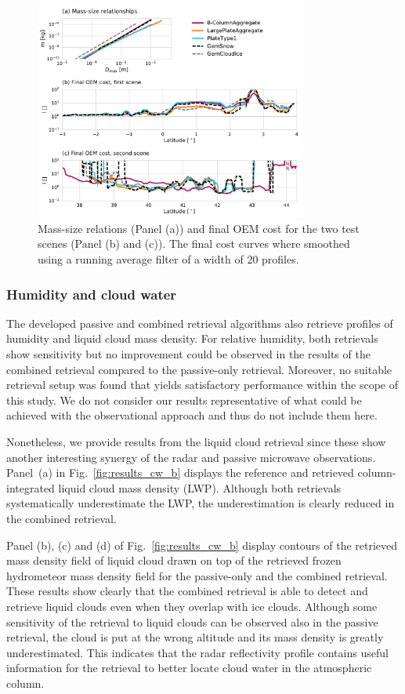 \documentclass[journal abbreviation, manuscript]{copernicus}
\begin{document}
\begin{figure}[!h]
\centering
\includegraphics[width = 0.8\textwidth]{../plots/costs}
\caption{Mass-size relations (Panel (a)) and final OEM cost for the two test scenes
  (Panel (b) and (c)). The final cost curves where smoothed using a running average filter
of a width of 20 profiles.}
\label{fig:costs}
\end{figure}


\subsubsection{Humidity and cloud water}

The developed passive and combined retrieval algorithms also retrieve profiles
of humidity and liquid cloud mass density. For relative humidity, both
retrievals show sensitivity but no improvement could be observed in the results
of the combined retrieval compared to the passive-only retrieval. Moreover, no
suitable retrieval setup was found that yields satisfactory performance within
the scope of this study. We do not consider our results representative of what
could be achieved with the observational approach and thus do not include them
here.

Nonetheless, we provide results from the liquid cloud retrieval since these show
another interesting synergy of the radar and passive microwave observations.
Panel~(a) in Fig.~\ref{fig:results_cw_b} displays the reference and retrieved
column-integrated liquid cloud mass density (LWP). Although both retrievals
systematically underestimate the LWP, the underestimation is clearly reduced in
the combined retrieval.

Panel (b), (c) and (d) of Fig.~\ref{fig:results_cw_b} display contours of the
retrieved mass density field of liquid cloud drawn on top of the retrieved
frozen hydrometeor mass density field for the passive-only and the combined
retrieval. These results show clearly that the combined retrieval is able to
detect and retrieve liquid clouds even when they overlap with ice clouds.
Although some sensitivity of the retrieval to liquid clouds can be observed also
in the passive retrieval, the cloud is put at the wrong altitude and its mass
density is greatly underestimated. This indicates that the radar reflectivity
profile contains useful information for the retrieval to better locate cloud
water in the atmospheric column.
\end{document}
